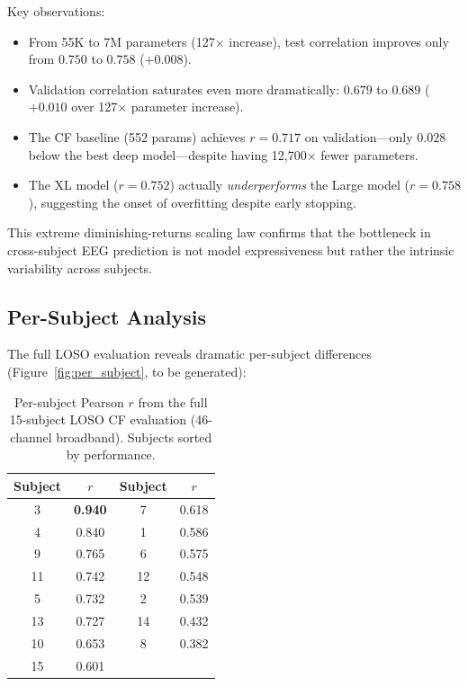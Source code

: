 \documentclass[conference]{IEEEtran}
\begin{document}
Key observations:
\begin{itemize}
    \item From 55K to 7M parameters (127$\times$ increase), test correlation improves only from $0.750$ to $0.758$ ($+0.008$).
    \item Validation correlation saturates even more dramatically: $0.679$ to $0.689$ ($+0.010$ over 127$\times$ parameter increase).
    \item The CF baseline (552 params) achieves $r = 0.717$ on validation---only $0.028$ below the best deep model---despite having 12,700$\times$ fewer parameters.
    \item The XL model ($r = 0.752$) actually \emph{underperforms} the Large model ($r = 0.758$), suggesting the onset of overfitting despite early stopping.
\end{itemize}

This extreme diminishing-returns scaling law confirms that the bottleneck in cross-subject EEG prediction is not model expressiveness but rather the intrinsic variability across subjects.

\subsection{Per-Subject Analysis}

The full LOSO evaluation reveals dramatic per-subject differences (Figure~\ref{fig:per_subject}, to be generated):

\begin{table}[t]
\centering
\caption{Per-subject Pearson $r$ from the full 15-subject LOSO CF evaluation (46-channel broadband). Subjects sorted by performance.}
\label{tab:per_subject}
\begin{tabular}{@{}cccc@{}}
\toprule
Subject & $r$ & Subject & $r$ \\
\midrule
3 & \textbf{0.940} & 7 & 0.618 \\
4 & 0.840 & 1 & 0.586 \\
9 & 0.765 & 6 & 0.575 \\
11 & 0.742 & 12 & 0.548 \\
5 & 0.732 & 2 & 0.539 \\
13 & 0.727 & 14 & 0.432 \\
10 & 0.653 & 8 & 0.382 \\
15 & 0.601 & & \\
\bottomrule
\end{tabular}
\end{table}
\end{document}
